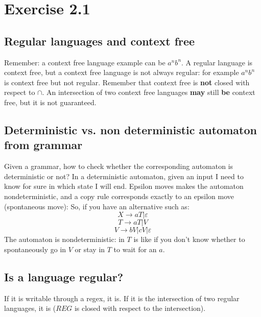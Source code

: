    \section{Exercise 2.1}
        \subsection{Regular languages and context free}
            Remember: a context free language example can be $a^nb^n$. A regular language is context free, but a context free language is not always regular: for example
            $a^nb^n$ is context free but not regular. Remember that context free is \textbf{not} closed with respect to $\cap$. An intersection of two context free 
            languages \textbf{may} still \textbf{be} context free, but it is not guaranteed.
        \subsection{Deterministic vs. non deterministic automaton from grammar}
            Given a grammar, how to check whether the corresponding automaton is deterministic or not? In a deterministic automaton, given an input I need to know for 
            sure in which state I will end. Epsilon moves makes the automaton nondeterministic, and a copy rule corresponds exactly to an epsilon move (spontaneous move):
            So, if you have an alternative such as:
            $$X\rightarrow aT \vert \varepsilon$$
            $$T\rightarrow aT\vert V$$
            $$V\rightarrow bV\vert cV\vert\varepsilon$$
            The automaton is nondeterministic: in $T$ is like if you don't know whether to spontaneously go in $V$ or stay in $T$ to wait for an $a$.
        \subsection{Is a language regular?}
            If it is writable through a regex, it is. If it is the intersection of two regular languages, it is ($REG$ is closed with respect to the intersection).
